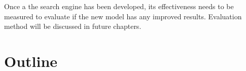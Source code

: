 Once a the search engine has been developed, its effectiveness needs to be measured to evaluate if the new model has any improved results. Evaluation method will be discussed in future chapters.



\section{Outline} 




